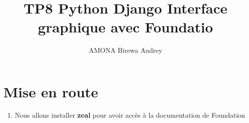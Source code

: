 \documentclass[11pt,a4paper]{article}
\author{AMONA Birewa Audrey}
\title{ TP8 Python Django
Interface graphique avec Foundatio }
\begin{document}
\maketitle
\tableofcontents
\begin{abstract}
\end{abstract}
\section{Mise en route}
\begin{enumerate}
\item Nous allons installer \textbf{zeal} pour avoir accès à la documentation de Foundation
\end{enumerate}
\end{document}

